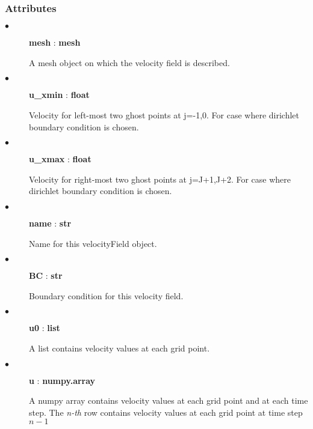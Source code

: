 \documentclass[11pt]{article}
\begin{document}
        \subsubsection{Attributes}
        \begin{description}
            \item[$\bullet$] \textbf{mesh} : \textbf{mesh}
                \par
                A mesh object on which the velocity field is described.
            \item[$\bullet$] \textbf{u\_xmin} : \textbf{float}
                \par
                Velocity for left-most two ghost points at j=-1,0. For case where dirichlet boundary condition is chosen.
            \item[$\bullet$] \textbf{u\_xmax} : \textbf{float}
                \par
                Velocity for right-most two ghost points at j=J+1,J+2. For case where dirichlet boundary condition is chosen.
            \item[$\bullet$] \textbf{name} : \textbf{str}
                \par
                Name for this velocityField object.
            \item[$\bullet$] \textbf{BC} : \textbf{str}
                \par
                Boundary condition for this velocity field.
            \item[$\bullet$] \textbf{u0} : \textbf{list}
                \par
                A list contains velocity values at each grid point.
            \item[$\bullet$] \textbf{u} : \textbf{numpy.array}
                \par
                A numpy array contains velocity values at each grid point and at each time step.
                The \textit{n-th} row contains velocity values at each grid point at time step $n-1$
                
        \end{description}
\end{document}
